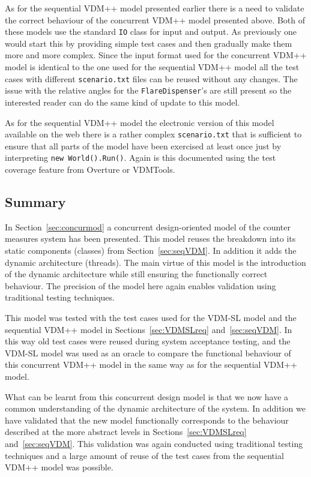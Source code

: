 \documentclass{overturerepchap}
\newcommand{\VDMTools}{VDMTools}
\begin{document}
As for the sequential VDM++ model presented earlier there is a need to
validate the correct behaviour of the concurrent VDM++ model presented
above. Both of these models use the standard
\texttt{IO} class for input and output. As previously one would start 
this by providing simple test cases and
then gradually make them more and more complex. Since the input format
used for the concurrent VDM++ model is identical to the one used for the
sequential VDM++ model all the test cases with different 
\texttt{scenario.txt} files can be reused without any changes. 
The issue with the 
relative angles for the \texttt{FlareDispenser}'s are still present
so the interested reader can do the same kind of update to this model.

As for the sequential VDM++ model the electronic
version of this model available on the web there is a rather complex 
\texttt{scenario.txt} that is sufficient to ensure that all parts of the
model have been exercised at least once just by interpreting
\texttt{new World().Run()}. Again is this documented using the
test coverage feature from Overture or \VDMTools. 

\subsection{Summary}

In Section~\ref{sec:concurmod} a concurrent design-oriented model of
the counter measures system has been presented. This model reuses the
breakdown into its static components (classes) from
Section~\ref{sec:seqVDM}. In addition it adds the dynamic architecture
(threads). The main virtue of this model is the introduction of the
dynamic architecture while still ensuring the functionally correct
behaviour. The precision of the model here again enables validation
using traditional testing techniques.

This model was tested with the test cases used for the VDM-SL model
and the sequential VDM++ model in Sections~\ref{sec:VDMSLreq}
and~\ref{sec:seqVDM}. In this way old test cases were reused during
system acceptance testing, and the VDM-SL model was used as an oracle
to compare the functional behaviour of this concurrent VDM++ model in
the same way as for the sequential VDM++ model.

What can be learnt from this concurrent design model is
that we now have a common understanding of the dynamic architecture of
the system. In addition we have validated that the new model
functionally corresponds to the behaviour described at the more
abstract levels in Sections~\ref{sec:VDMSLreq}
and~\ref{sec:seqVDM}. This validation was again conducted using
traditional testing techniques and a large amount of reuse of the test
cases from the sequential VDM++ model was possible.
\end{document}
